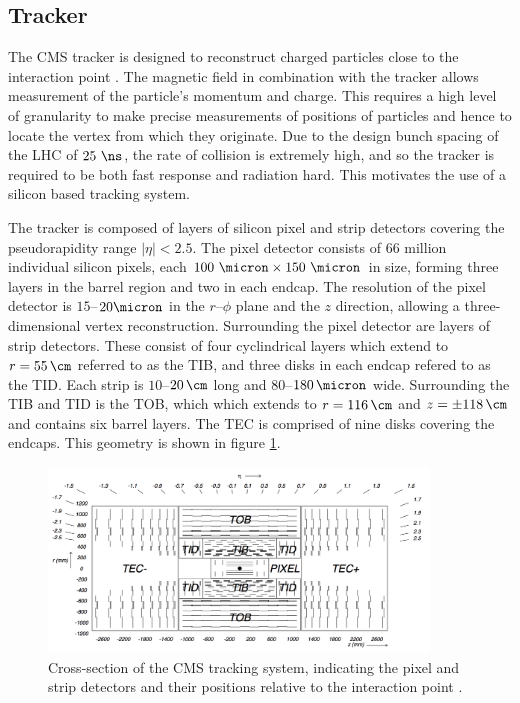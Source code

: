 \subsection{Tracker}
\label{sec:tracker}

The CMS tracker is designed to reconstruct charged particles close to the
interaction point \cite{Chatrchyan:2008aa}. The magnetic field in combination with the tracker allows
measurement of the particle's momentum and charge. This requires a high level of
granularity to make precise measurements of positions of particles and hence to
locate the vertex from which they originate. Due to the design bunch spacing
of the LHC of $25~\ns$, the rate of collision is extremely high, and so the tracker is
required to be both fast response and radiation hard. This motivates the use of a
silicon based tracking system.

The tracker is composed of layers of silicon pixel and strip detectors covering
the pseudorapidity range $|\eta| < 2.5$. The pixel detector consists of 66
million individual silicon pixels, each $100~\micron \times 150~\micron$
in size, forming three layers in the barrel region and two in each endcap. The
resolution of the pixel detector is $15$--$20\micron$ in the $r$--$\phi$ plane
and the $z$ direction, allowing a three-dimensional vertex reconstruction.
Surrounding the pixel detector are layers of strip detectors. These consist of
four cyclindrical layers which extend to $r=55\,\cm$ referred to as the
\ac{TIB}, and three disks in each endcap refered to as the \ac{TID}. Each strip
is $10$--$20\,\cm$ long and $80$--$180\,\micron$ wide. Surrounding the \ac{TIB}
and \ac{TID} is the \ac{TOB}, which which extends to $r=116\,\cm$ and
$z=\pm118\,\cm$ and contains six barrel layers. The \ac{TEC} is comprised of nine
disks covering the endcaps. This geometry is shown in figure
\ref{fig:trackerlayout}.

\begin{figure}[htbp]
   \includegraphics[width=0.9\textwidth]{plots/detector/tracker_layout.png}
\caption{Cross-section of the CMS tracking system, indicating the pixel and
strip detectors and their positions relative to the interaction point \cite{Chatrchyan:2008aa}.}
\label{fig:trackerlayout}
\end{figure}

